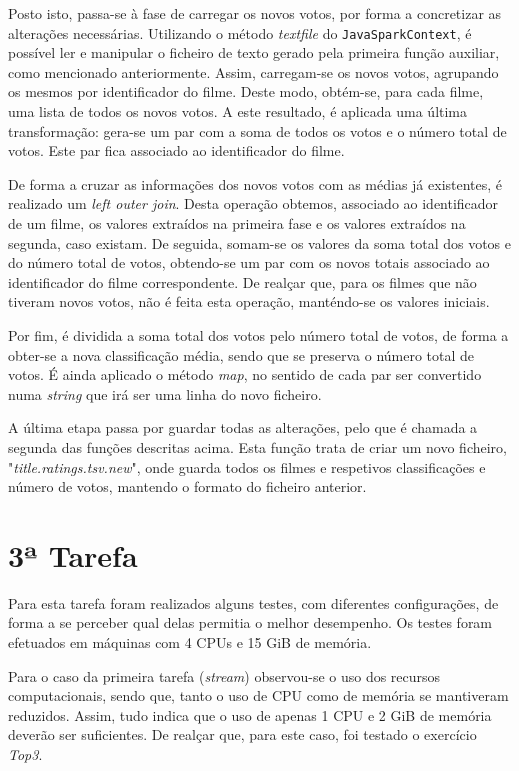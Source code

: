 \documentclass[a4paper]{report}
\begin{document}
            Posto isto, passa-se à fase de carregar os novos votos, por forma a concretizar as alterações necessárias.
            Utilizando o método \textit{textfile} do \texttt{JavaSparkContext}, é possível ler e manipular o ficheiro de texto gerado pela primeira função auxiliar, como mencionado anteriormente.
            Assim, carregam-se os novos votos, agrupando os mesmos por identificador do filme. Deste modo, obtém-se, para cada filme, uma lista de todos os novos votos.
            A este resultado, é aplicada uma última transformação: gera-se um par com a soma de todos os votos e o número total de votos. Este par fica associado ao identificador do filme.

            De forma a cruzar as informações dos novos votos com as médias já existentes, é realizado um \textit{left outer join}.
            Desta operação obtemos, associado ao identificador de um filme, os valores extraídos na primeira fase e os valores extraídos na segunda, caso existam.
            De seguida, somam-se os valores da soma total dos votos e do número total de votos, obtendo-se um par com os novos totais associado ao identificador do filme correspondente.
            De realçar que, para os filmes que não tiveram novos votos, não é feita esta operação, manténdo-se os valores iniciais.

            Por fim, é dividida a soma total dos votos pelo número total de votos, de forma a obter-se a nova classificação média, sendo que se preserva o número total de votos.
            É ainda aplicado o método \textit{map}, no sentido de cada par ser convertido numa \textit{string} que irá ser uma linha do novo ficheiro.

            A última etapa passa por guardar todas as alterações, pelo que é chamada a segunda das funções descritas acima.
            Esta função trata de criar um novo ficheiro, "\textsl{title.ratings.tsv.new}", onde guarda todos os filmes e respetivos classificações e número de votos, mantendo o formato do ficheiro anterior.


    \section{3ª Tarefa} \label{sec:Task3}
    Para esta tarefa foram realizados alguns testes, com diferentes configurações, de forma a se perceber qual delas permitia o melhor desempenho.
    Os testes foram efetuados em máquinas com 4 CPUs e 15 GiB de memória.

    Para o caso da primeira tarefa (\textit{stream}) observou-se o uso dos recursos computacionais, sendo que, tanto o uso de CPU como de memória se mantiveram reduzidos.
    Assim, tudo indica que o uso de apenas 1 CPU e 2 GiB de memória deverão ser suficientes.
    De realçar que, para este caso, foi testado o exercício \textit{Top3}.
\end{document}
